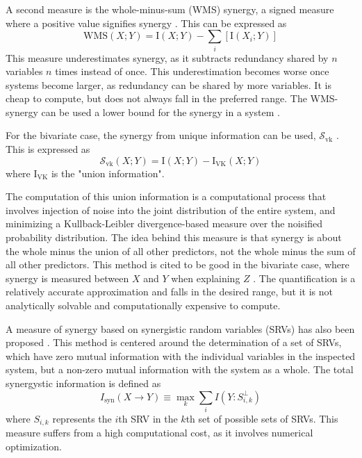 \documentclass[../main.tex]{subfiles}
\begin{document}
A second measure is the whole-minus-sum (WMS) synergy, a signed measure where a positive value
signifies synergy \cite{gawne1993independent, griffith2014quantifying}.
This can be expressed as
%
\begin{equation}
\mathrm{WMS}(X;Y) = \mathrm{I}(X;Y) - \sum_i [\mathrm{I}(X_i;Y)]
\label{WMS}
\end{equation}
%
This measure underestimates synergy, as it subtracts redundancy shared by $n$ variables $n$ times instead of once.
This underestimation becomes worse once systems become larger, as redundancy can be shared by more variables.
It is cheap to compute, but does not always fall in the preferred range.
The WMS-synergy can be used a lower bound for the synergy in a system \cite{griffith2014quantifying, olbrich2015information}.

For the bivariate case, the synergy from unique information can be used, $\mathcal{S}_\mathrm{vk}$ \cite{bertschinger2014quantifying, griffith2014quantifying, olbrich2015information}.
This is expressed as
\begin{equation}
\mathcal{S}_\mathrm{vk} (X;Y) = \mathrm{I}(X;Y) - \mathrm{I}_\mathrm{VK} (X;Y)
\end{equation}
%
where $\mathrm{I}_\mathrm{VK}$ is the "union information".

The computation of this union information is a computational process that involves injection of noise into the joint distribution of the entire system, and minimizing a Kullback-Leibler divergence-based measure over the noisified probability distribution.
The idea behind this measure is that synergy is about the whole minus the union of all other predictors, not the whole minus the sum of all other predictors.
This method is cited to be good in the bivariate case, where synergy is measured between $X$ and $Y$ when explaining $Z$ \cite{olbrich2015information}.
The quantification is a relatively accurate approximation and falls in the desired range, but it is not analytically solvable and computationally expensive to compute.

A measure of synergy based on synergistic random variables (SRVs) has also been proposed \cite{quax2017quantifying}.
This method is centered around the determination of a set of SRVs, which have zero mutual information with the individual variables in the inspected system, but a non-zero mutual information with the system as a whole.
The total synergystic information is defined as
\begin{equation}
\label{SRV}
I_\mathrm{syn}(X \rightarrow Y) \equiv \max_k \sum_i I(Y : S_{i,k}^\perp)
\end{equation}
where $S_{i,k}$ represents the $i$th SRV in the $k$th set of possible sets of SRVs.
This measure suffers from a high computational cost, as it involves numerical optimization.
\end{document}
